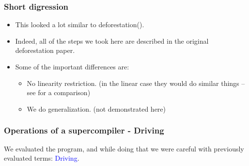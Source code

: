 \documentclass{beamer}
\begin{document}
\begin{frame}

    \frametitle{Short digression}

    \begin{itemize}[<+->]

        \item[]
            This looked a lot similar to deforestation(\citet{deforestation}).
        \item[]
            Indeed, all of the steps we took here are described in the original
            deforestation paper.
        \item[]
            Some of the important differences are:
            \begin{itemize}[<+->]
                \item
                    No linearity restriction. (in the linear case they would do
                    similar things -- see \citet{towardsunifying} for a
                    comparison)
                \item We do generalization. (not demonstrated here)
            \end{itemize}

    \end{itemize}

\end{frame}

\begin{frame}

    \frametitle{Operations of a supercompiler - Driving}

    We evaluated the program, and while doing that we were careful
    with previously evaluated terms: \textcolor{blue}{Driving}.

\end{frame}
\end{document}
